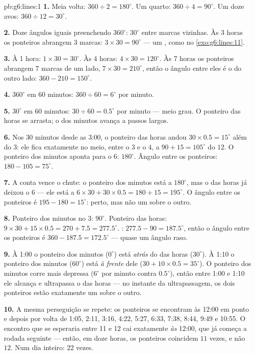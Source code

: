 \begin{solution}{pb:g6:lines:1}
\textbf{1.} Meia volta: $360 \div 2 = 180^\circ$. Um quarto:
$360 \div 4 = 90^\circ$. Um doze avos: $360 \div 12 = 30^\circ$.

\textbf{2.} Doze ângulos iguais preenchendo $360^\circ$: $30^\circ$
entre marcas vizinhas. Às 3 horas os ponteiros abrangem $3$ marcas:
$3 \times 30 = 90^\circ$ --- um , como no
\cref{exo:g6:lines:11}.

\textbf{3.} À 1 hora: $1 \times 30 = 30^\circ$. Às 4 horas:
$4 \times 30 = 120^\circ$. Às 7 horas os ponteiros abrangem $7$ marcas
de um lado, $7 \times 30 = 210^\circ$, então o ângulo entre eles é o do
outro lado: $360 - 210 = 150^\circ$.

\textbf{4.} $360^\circ$ em $60$ minutos: $360 \div 60 = 6^\circ$ por
minuto.

\textbf{5.} $30^\circ$ em $60$ minutos: $30 \div 60 = 0.5^\circ$ por
minuto --- meio grau. O ponteiro das horas se arrasta; o dos minutos
avança a passos largos.

\textbf{6.} Nos $30$ minutos desde as 3:00, o ponteiro das horas andou
$30 \times 0.5 = 15^\circ$ além do $3$: ele fica exatamente no meio,
entre o $3$ e o $4$, a $90 + 15 = 105^\circ$ do $12$. O ponteiro dos
minutos aponta para o $6$: $180^\circ$. Ângulo entre os ponteiros:
$180 - 105 = 75^\circ$.

\textbf{7.} A conta vence o chute: o ponteiro dos minutos está a
$180^\circ$, mas o das horas já deixou o $6$ --- ele está a
$6 \times 30 + 30 \times 0.5 = 180 + 15 = 195^\circ$. O ângulo entre os
ponteiros é $195 - 180 = 15^\circ$: perto, mas não um sobre o outro.

\textbf{8.} Ponteiro dos minutos no $3$: $90^\circ$. Ponteiro das
horas: $9 \times 30 + 15 \times 0.5 = 270 + 7.5 = 277.5^\circ$.
: $277.5 - 90 = 187.5^\circ$, então o ângulo entre os
ponteiros é $360 - 187.5 = 172.5^\circ$ --- quase um ângulo raso.

\textbf{9.} À 1:00 o ponteiro dos minutos ($0^\circ$) está
\emph{atrás} do das horas ($30^\circ$). À 1:10 o ponteiro dos minutos
($60^\circ$) está \emph{à frente} dele
($30 + 10 \times 0.5 = 35^\circ$). O ponteiro dos minutos corre mais
depressa ($6^\circ$ por minuto contra $0.5^\circ$), então entre 1:00 e
1:10 ele alcança e ultrapassa o das horas --- no instante da
ultrapassagem, os dois ponteiros estão exatamente um sobre o outro.

\textbf{10.} A mesma perseguição se repete: os ponteiros se encontram
às 12:00 em ponto e depois por volta de 1:05, 2:11, 3:16, 4:22, 5:27,
6:33, 7:38, 8:44, 9:49 e 10:55. O encontro que se esperaria entre 11 e
12 cai exatamente \emph{às} 12:00, que já começa a rodada seguinte ---
então, em doze horas, os ponteiros coincidem $11$ vezes, e não $12$.
Num dia inteiro: $22$ vezes.


\end{solution}

